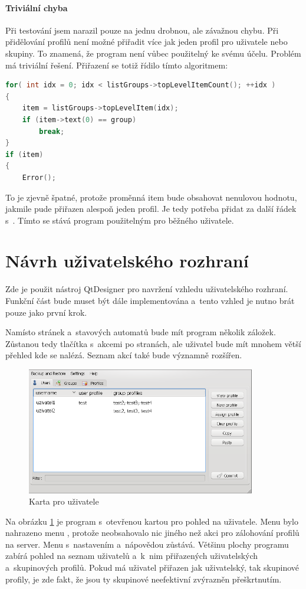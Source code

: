 \paragraph{Triviální chyba}
Při testování jsem narazil pouze na jednu drobnou, ale závažnou chybu. Při přidělování profilů není možné přiřadit více jak jeden profil pro uživatele nebo skupiny. To znamená, že program není vůbec použitelný ke svému účelu. Problém má triviální řešení. Přiřazení se totiž řídilo tímto algoritmem:
\begin{lstlisting}[language=C++]
for( int idx = 0; idx < listGroups->topLevelItemCount(); ++idx )
{
    item = listGroups->topLevelItem(idx);
    if (item->text(0) == group)
        break;
}
if (item)
{
    Error();
\end{lstlisting}
To je zjevně špatné, protože proměnná item bude obsahovat nenulovou hodnotu, jakmile pude přiřazen alespoň jeden profil. Je tedy potřeba přidat za  další řádek s~. Tímto se stává program použitelným pro běžného uživatele.

\section{Návrh uživatelského rozhraní}
Zde je použit nástroj QtDesigner pro navržení vzhledu uživatelského rozhraní. Funkční část bude muset být dále implementována a~tento vzhled je nutno brát pouze jako první krok.

Namísto stránek a~stavových automatů bude mít program několik záložek. Zůstanou tedy tlačítka s~akcemi po stranách, ale uživatel bude mít mnohem větší přehled kde se nalézá. Seznam akcí také bude významně rozšířen.

\begin{figure}
\centering
\includegraphics[width=10cm]{obrazky/navrh-usersz.png}
\caption{Karta pro uživatele}
\label{fig:kt4_newusers}
\end{figure}

Na obrázku \ref{fig:kt4_newusers} je program s~otevřenou kartou pro pohled na uživatele. Menu  bylo nahrazeno menu , protože neobsahovalo nic jiného než akci pro zálohování profilů na server. Menu s~nastavením a~nápovědou zůstává. Většinu plochy programu zabírá pohled na seznam uživatelů a~k~nim přiřazených uživatelských a~skupinových profilů. Pokud má uživatel přiřazen jak uživatelský, tak skupinové profily, je zde fakt, že jsou ty skupinové neefektivní zvýrazněn přeškrtnutím.

